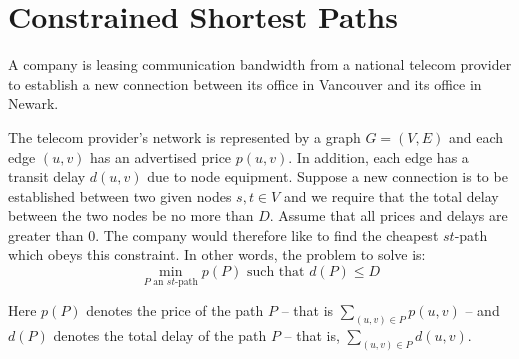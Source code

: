 \section{Constrained Shortest Paths}
A  company is leasing communication bandwidth from a national telecom provider to establish  a new connection between its office in Vancouver and its office in Newark.

The telecom provider's network is represented by a graph $G=(V,E)$ and each edge $(u,v)$ has an advertised price $p(u,v)$.  In addition, each edge
has a transit delay $d(u,v)$ due to node equipment. Suppose a new connection is to be established between two given nodes $s,t \in V$ and we require that the total delay between the two nodes be no more than $D$. Assume that all prices and delays are greater than 0. The company would therefore like to find the cheapest $st$-path which obeys  this constraint. In other words, the problem to solve is:
\[
	\min_{\mbox{$P$ an $st$-path}}  p(P) \textrm{ such that } d(P)\leq D
\]

Here $p(P)$ denotes the price of the path $P$ -- that is $\sum_{(u,v) \in P} p(u,v)$ -- and $d(P)$ denotes the total delay of the path $P$ -- that is, $\sum_{(u,v) \in P} d(u,v)$.


